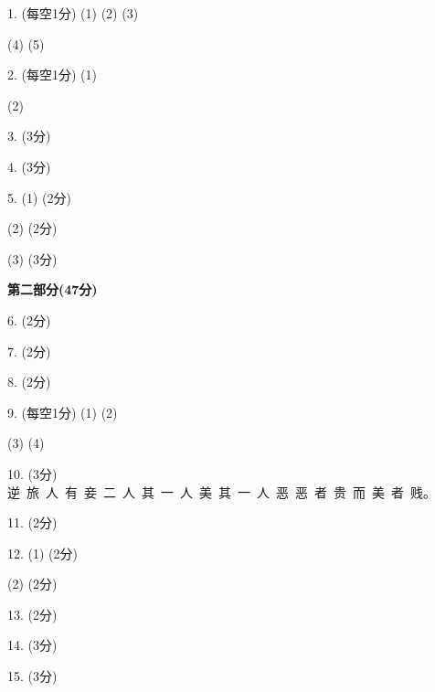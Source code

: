 \documentclass[11pt]{article}
\newcommand{\s}{\uline{\qquad \qquad \qquad \qquad} \quad} %
\renewcommand{\u}{\uline{\hfill}} %
\begin{document}
\begin{minipage}{0.477\linewidth}
\begin{tcolorbox}[left=0.5mm,right=0.5mm,height=21.5cm,colback=white,boxrule=0.5pt]
\begin{framed}
    1. (每空1分) (1) \s (2) \s (3) \s 

    \quad (4) \s (5) \s \s

    2. (每空1分) (1) \s \s 
    
    \quad (2) \s \s

    3. (3分) \s
    
    4. (3分) \s
    
    5. (1) (2分) \u

    \u

    \quad (2) (2分) \u
    
    \u

    \quad (3) (3分) \u
    
    \u

    \u
\end{framed}


\end{tcolorbox}
\end{minipage}\hfill
\begin{minipage}{0.477\linewidth}
    \begin{tcolorbox}[left=0.5mm,right=0.5mm,height=21.5cm,colback=white,boxrule=0.5pt]
        
    {\bfseries 第二部分(47分)}
    \vspace{-10pt}
    \begin{framed}
        6. (2分) \s
        
        7. (2分) \u

        \u

        \u

        8. (2分) \u

        \u

        \u

        9. (每空1分) (1) \s (2) \s 

        \quad (3) \s (4) \s

        10. (3分) 逆\ 旅\ 人\ 有\ 妾\ 二\ 人\ 其\ 一\ 人\ 美\ 其\ 一\ 人\ 恶\ 恶\ 者\ 贵\ 而\ 美\ 者\ 贱。

        11. (2分) \s

        12. (1) (2分) \u

        \u

        \quad (2) (2分) \u
        
        \u

        13. (2分) \u

        \u    
        
        \u

        14. (3分) \u

        \u    
        
        \u

        15. (3分) \u

        \u

    \end{framed}

    \end{tcolorbox}
\end{minipage}
\end{document}
